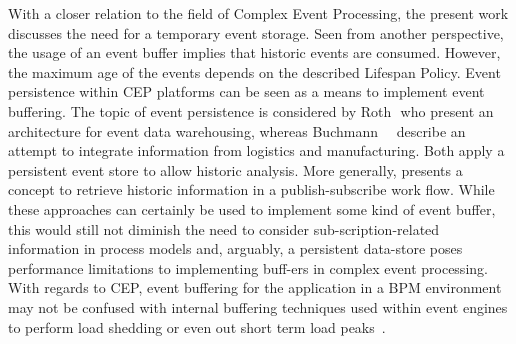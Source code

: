 With a closer relation to the field of Complex Event Processing, the present work discusses the need for a temporary event storage. 
Seen from another perspective, the usage of an event buffer implies that historic events are consumed. However, the maximum age of the events depends on the described Lifespan Policy.
Event persistence within CEP platforms can be seen as a means to implement event buffering.
The topic of event persistence is considered by Roth\,\etal\,\cite{roth2010event} who present an architecture for event data warehousing, whereas Buchmann~\etal~\cite{buchmann2010event} describe an attempt to integrate information from logistics and manufacturing. 
Both apply a persistent event store to allow historic analysis.
More generally, \cite{li2007historic} presents a concept to retrieve historic information in a publish-subscribe work flow.
While these approaches can certainly be used to implement some kind of event buffer, this would still not diminish the need to consider sub-scription-related information in process models and, arguably, a persistent data-store poses performance limitations to implementing buff-ers in complex event processing.
With regards to CEP, event buffering for the application in a BPM environment may not be confused with internal buffering techniques used within event engines to perform load shedding or even out short term load peaks~\cite{chakravarthy2009stream}.




